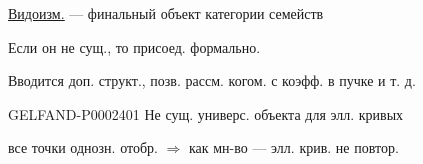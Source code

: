 \underline{\underline{Видоизм.}} — финальный объект категории семейств



Если он не сущ., то присоед. формально.



Вводится доп. структ., позв. рассм. когом. с коэфф. в пучке и т. д.



\begin{GelfandAdjacentEvidence}{GELFAND-P000240}{1}
Не сущ. универс. объекта для элл. кривых




\end{GelfandAdjacentEvidence}

все точки однозн. отобр. $\Rightarrow$ как мн-во — элл. крив. не повтор.



